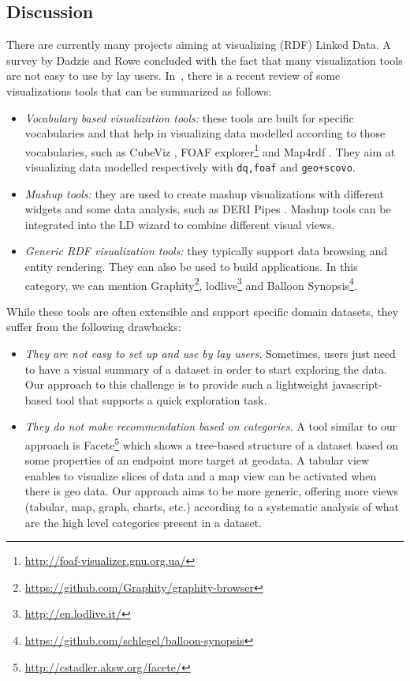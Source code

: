 \subsection{Discussion}
\label{sec:discussion}
There are currently many projects aiming at visualizing (RDF) Linked Data. A survey by Dadzie and Rowe \cite{Dadzie:2011} concluded with the fact that many visualization tools are not easy to use by lay users. In~\cite{Klimek2014}, there is a recent review of some visualizations tools that can be summarized as follows:
\begin{itemize}
 \item \textit{Vocabulary based visualization tools:} these tools are built for specific vocabularies and that help in visualizing data modelled according to those vocabularies, such as CubeViz \cite{cubeviz:2012}, FOAF explorer\footnote{\url{http://foaf-visualizer.gnu.org.ua/}} and Map4rdf \cite{leon2012}. They aim at visualizing data modelled respectively with \texttt{dq,foaf} and \texttt{geo+scovo}.
 \item \textit{Mashup tools:} they are used to create mashup visualizations with different widgets and some data analysis, such as DERI Pipes \cite{danh2009}. Mashup tools can be integrated into the LD wizard to combine different visual views.  
 \item \textit{Generic RDF visualization tools:} they typically support data browsing and entity rendering. They can also be used to build applications. In this category, we can mention Graphity\footnote{\url{https://github.com/Graphity/graphity-browser}}, lodlive\footnote{\url{http://en.lodlive.it/}} and Balloon Synopsis\footnote{\url{https://github.com/schlegel/balloon-synopsis}}.
\end{itemize}
While these tools are often extensible and support specific domain datasets, they suffer from the following drawbacks:
\begin{itemize}
 \item \textit{They are not easy to set up and use by lay users}. Sometimes, users just need to have a visual summary of a dataset in order to start exploring the data. Our approach to this challenge is to provide such a lightweight javascript-based tool that supports a quick exploration task.
 \item \textit{They do not make recommendation based on categories}. A tool similar to our approach is Facete\footnote{\url{http://cstadler.aksw.org/facete/}}\cite{facete:2014} which shows a tree-based structure of a dataset based on some properties of an endpoint more target at geodata. A tabular view enables to visualize slices of data and a map view can be activated when there is geo data. Our approach aims to be more generic, offering more views (tabular, map, graph, charts, etc.) according to a systematic analysis of what are the high level categories present in a dataset.
\end{itemize}

